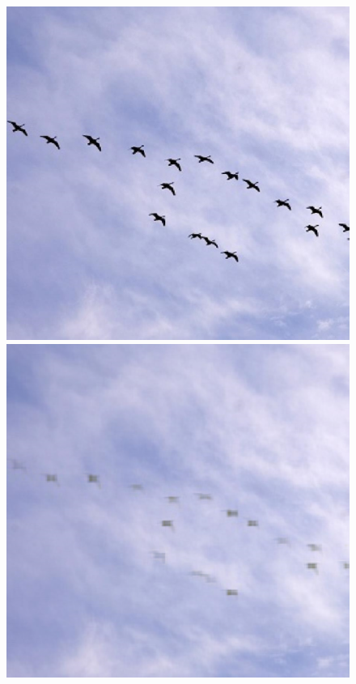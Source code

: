 \documentclass{article}
\begin{document}
    \begin{figure}[h]
    	\includegraphics[scale=0.55]{../figures/test-6.png}
    	\quad
    	\includegraphics[scale=0.276]{../figures/A-5.png}
    	\quad

\end{figure}
\end{document}
